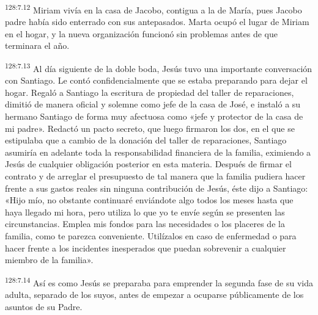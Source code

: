 \par
\textsuperscript{128:7.12} Miriam vivía en la casa de Jacobo, contigua a la de María, pues Jacobo padre había sido enterrado con sus antepasados. Marta ocupó el lugar de Miriam en el hogar, y la nueva organización funcionó sin problemas antes de que terminara el año.

\par
\textsuperscript{128:7.13} Al día siguiente de la doble boda, Jesús tuvo una importante conversación con Santiago. Le contó confidencialmente que se estaba preparando para dejar el hogar. Regaló a Santiago la escritura de propiedad del taller de reparaciones, dimitió de manera oficial y solemne como jefe de la casa de José, e instaló a su hermano Santiago de forma muy afectuosa como «jefe y protector de la casa de mi padre». Redactó un pacto secreto, que luego firmaron los dos, en el que se estipulaba que a cambio de la donación del taller de reparaciones, Santiago asumiría en adelante toda la responsabilidad financiera de la familia, eximiendo a Jesús de cualquier obligación posterior en esta materia. Después de firmar el contrato y de arreglar el presupuesto de tal manera que la familia pudiera hacer frente a sus gastos reales sin ninguna contribución de Jesús, éste dijo a Santiago: «Hijo mío, no obstante continuaré enviándote algo todos los meses hasta que haya llegado mi hora, pero utiliza lo que yo te envíe según se presenten las circunstancias. Emplea mis fondos para las necesidades o los placeres de la familia, como te parezca conveniente. Utilízalos en caso de enfermedad o para hacer frente a los incidentes inesperados que puedan sobrevenir a cualquier miembro de la familia».

\par
\textsuperscript{128:7.14} Así es como Jesús se preparaba para emprender la segunda fase de su vida adulta, separado de los suyos, antes de empezar a ocuparse públicamente de los asuntos de su Padre.